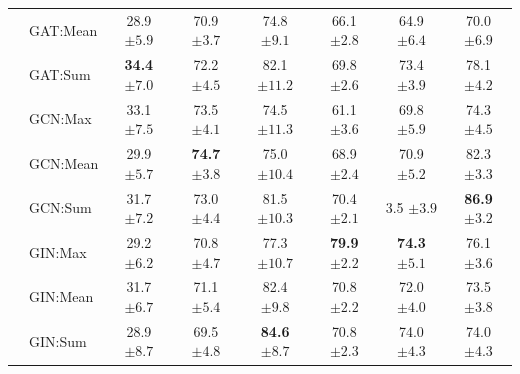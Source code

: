 \begin{table}[!htb]
{\begin{tabular}{@{}c <{\enspace}@{}lcccccc@{}}
			\\ 
			& \textsf{GAT:Mean}    & 28.9 \scriptsize $\pm 5.9$          & 70.9 \scriptsize $\pm 3.7$           & 74.8 \scriptsize $\pm 9.1$            & 66.1 \scriptsize $\pm 2.8$         & 64.9 \scriptsize $\pm 6.4$  & 70.0 \scriptsize $\pm 6.9$
			\\ 
			& \textsf{GAT:Sum}                  & \textbf{34.4} \scriptsize $\pm 7.0$          & 72.2 \scriptsize $\pm 4.5$	            & 82.1 \scriptsize $\pm 11.2$            & 69.8 \scriptsize $\pm 2.6$	          & 73.4 \scriptsize $\pm 3.9$ & 78.1 \scriptsize $\pm 4.2$        
			\\
			\cmidrule{2-8}
			& \textsf{GCN:Max} & 33.1 \scriptsize $\pm 7.5$ &	73.5 \scriptsize $\pm 4.1$	& 74.5 \scriptsize $\pm 11.3$ & 61.1 \scriptsize $\pm 3.6$ &	69.8 \scriptsize $\pm 5.9$ & 74.3 \scriptsize $\pm 4.5$
			\\ 
			& \textsf{GCN:Mean} & 29.9 \scriptsize $\pm 5.7$ &	\textbf{74.7} \scriptsize $\pm 3.8$ & 75.0 \scriptsize $\pm 10.4$ &	68.9 \scriptsize $\pm 2.4$ &	70.9 \scriptsize $\pm 5.2$ & 82.3 \scriptsize $\pm 3.3$
			\\ 
			& \textsf{GCN:Sum} & 31.7 \scriptsize $\pm 7.2$ &	73.0 \scriptsize $\pm 4.4$	& 81.5 \scriptsize $\pm 10.3$ & 70.4 \scriptsize $\pm 2.1$ & 3.5 \scriptsize $\pm 3.9$ & \textbf{86.9} \scriptsize $\pm 3.2$                       
			\\
			\cmidrule{2-8}	
						
			& \textsf{GIN:Max} & 29.2 \scriptsize $\pm 6.2$	& 70.8 \scriptsize $\pm 4.7$ & 77.3 \scriptsize $\pm 10.7$ & \textbf{79.9} \scriptsize $\pm 2.2$ & \textbf{74.3} \scriptsize $\pm 5.1$ & 76.1 \scriptsize $\pm 3.6$  
			\\ 
			& \textsf{GIN:Mean}  & 31.7 \scriptsize $\pm 6.7$	& 71.1 \scriptsize $\pm 5.4$ & 82.4 \scriptsize $\pm 9.8$ & 	70.8 \scriptsize $\pm 2.2$ & 72.0 \scriptsize $\pm 4.0$ & 73.5 \scriptsize $\pm 3.8$
			\\ 
			& \textsf{GIN:Sum} & 28.9 \scriptsize $\pm 8.7$ & 	69.5 \scriptsize $\pm 4.8$	& \textbf{84.6} \scriptsize $\pm 8.7$ & 70.8 \scriptsize $\pm 2.3$ & 74.0 \scriptsize $\pm 4.3$ & 74.0 \scriptsize $\pm 4.3$
			\\
			\bottomrule
		\end{tabular}}            
\end{table}


